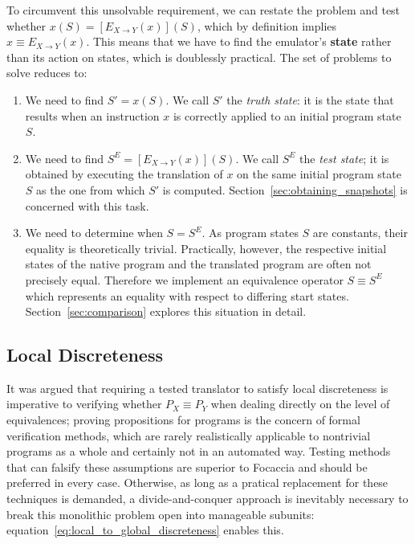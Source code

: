 To circumvent this unsolvable requirement, we can restate the problem and test whether $x(S) = [E_{X \rightarrow
Y}(x)](S)$, which by definition implies $x \equiv E_{X \rightarrow Y}(x)$. This means that we have to find the
emulator's \textbf{state} rather than its action on states, which is doublessly practical. The set of problems to solve
reduces to:

\begin{enumerate}

    \item We need to find $S' = x(S)$. We call $S'$ the \textit{truth state}: it is the state that results when an
        instruction $x$ is correctly applied to an initial program state $S$.

    \item We need to find $S^E = [E_{X \rightarrow Y}(x)](S)$. We call $S^E$ the \textit{test state}; it is obtained by
        executing the translation of $x$ on the same initial program state $S$ as the one from which $S'$ is computed.
        Section~\ref{sec:obtaining_snapshots} is concerned with this task.

    \item We need to determine when $S = S^E$. As program states $S$ are constants, their equality is theoretically
        trivial. Practically, however, the respective initial states of the native program and the translated program
        are often not precisely equal. Therefore we implement an equivalence operator $S \equiv S^E$ which represents an
        equality with respect to differing start states. Section~\ref{sec:comparison} explores this situation in detail.

\end{enumerate}

\subsection{Local Discreteness}\label{sec:local_discreteness}

It was argued that requiring a tested translator to satisfy local discreteness is imperative to verifying whether $P_X
\equiv P_Y$ when dealing directly on the level of equivalences; proving propositions for programs is the concern of
formal verification methods, which are rarely realistically applicable to nontrivial programs as a whole and certainly
not in an automated way. Testing methods that can falsify these assumptions are superior to Focaccia and should be
preferred in every case. Otherwise, as long as a pratical replacement for these techniques is demanded, a
divide-and-conquer approach is inevitably necessary to break this monolithic problem open into manageable subunits:
equation~\ref{eq:local_to_global_discreteness} enables this.

